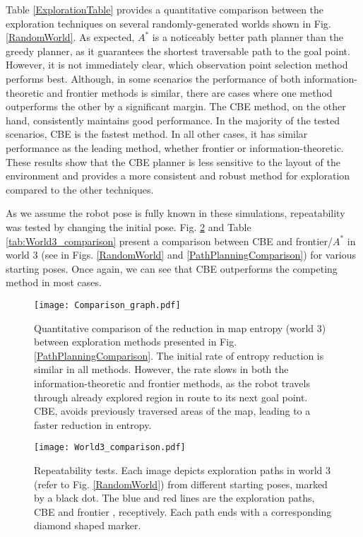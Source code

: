 \documentclass[shortAfour,sageh,times]{sagej_no_sage}
\begin{document}
Table \ref{ExplorationTable} provides a quantitative comparison between the exploration techniques on several randomly-generated worlds shown in Fig. \ref{RandomWorld}. As expected, $A^*$ is a noticeably better path planner than the greedy planner, as it guarantees the shortest traversable path to the goal point. However, it is not immediately clear, which observation point selection method performs best. Although, in some scenarios the performance of both information-theoretic and frontier methods is similar, there are cases where one method outperforms the other by a significant margin. The CBE method, on the other hand, consistently maintains good performance. In the majority of the tested scenarios, CBE is the fastest method. In all other cases, it has similar performance as the leading method, whether frontier or information-theoretic. These results show that the CBE planner is less sensitive to the layout of the environment and provides a more consistent and robust method for exploration compared to the other techniques.

As we assume the robot pose is fully known in these simulations, repeatability was tested by changing the initial pose. Fig. \ref{fig:world3_exploration_comparison} and Table \ref{tab:World3_comparison} present a comparison between CBE and frontier/$A^*$ in world 3 (see in Figs. \ref{RandomWorld} and \ref{PathPlanningComparison}) for various starting poses. Once again, we can see that CBE outperforms the competing method in most cases.   

 \begin{figure}[bt]
 	
 	\centering
 	
 	\texttt{[image: Comparison\_graph.pdf]}
 	
 	\caption{Quantitative comparison of the reduction in map entropy (world 3) between exploration methods presented in Fig. \ref{PathPlanningComparison}. The initial rate of entropy reduction is similar in all methods. However, the rate slows in both the information-theoretic and frontier methods, as the robot travels through already explored region in route to its next goal point. CBE, avoids previously traversed areas of the map, leading to a faster reduction in entropy. }
 	\label{Comparison_graph}
 \end{figure}
  
\begin{figure}[bthp]
	
	\centering
	
	\texttt{[image: World3\_comparison.pdf]}
	
	\caption{Repeatability tests. Each image depicts exploration paths in world 3 (refer to Fig. \ref{RandomWorld}) from different starting poses, marked by a black dot. The blue and red lines are the exploration paths, CBE and frontier \citep{Yamauchi1997}, receptively. Each path ends with a corresponding diamond shaped marker.} 
	\label{fig:world3_exploration_comparison}
\end{figure}
\end{document}
